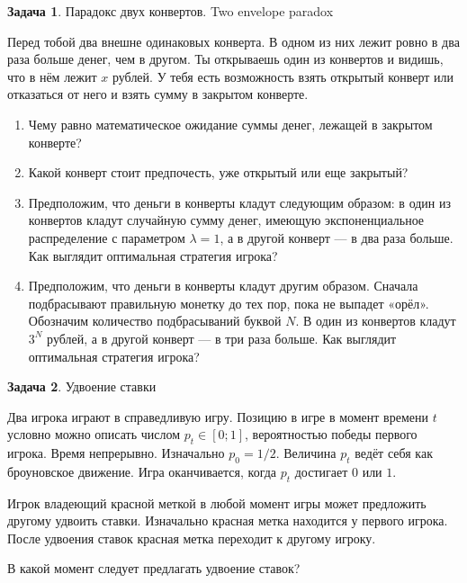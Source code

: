 \documentclass[nobib]{tufte-handout}
\theoremstyle{definition}
\newtheorem{problem}{Задача}
\begin{document}
\begin{problem}
Парадокс двух конвертов. Two envelope paradox

Перед тобой два внешне одинаковых конверта. В одном из них лежит ровно в два раза больше денег, чем в другом. Ты открываешь один из конвертов и видишь, что в нём лежит $x$ рублей. У тебя есть возможность взять открытый конверт или отказаться от него и взять сумму в закрытом конверте.

\begin{enumerate}
\item Чему равно математическое ожидание суммы денег, лежащей в закрытом конверте?
\item Какой конверт стоит предпочесть, уже открытый или еще закрытый?
\item Предположим, что деньги в конверты кладут следующим образом: в один из конвертов кладут случайную сумму денег, имеющую экспоненциальное распределение с параметром $\lambda=1$, а в другой конверт — в два раза больше. Как выглядит оптимальная стратегия игрока?
\item Предположим, что деньги в конверты кладут другим образом. Сначала подбрасывают правильную монетку до тех пор, пока не выпадет «орёл». Обозначим количество подбрасываний буквой $N$. В один из конвертов кладут $3^N$ рублей, а в другой конверт — в три раза больше. Как выглядит оптимальная стратегия игрока?
\end{enumerate}


\end{problem}


\begin{problem}
Удвоение ставки

Два игрока играют в справедливую игру. Позицию в игре в момент времени $t$ условно можно описать числом $p_t \in [0;1]$, вероятностью победы первого игрока. Время непрерывно. Изначально $p_0=1/2$. Величина $p_t$ ведёт себя как броуновское движение. Игра оканчивается, когда $p_t$ достигает $0$ или $1$.

Игрок владеющий красной меткой в любой момент игры может предложить другому удвоить ставки. Изначально красная метка находится у первого игрока. После удвоения ставок красная метка переходит к другому игроку.

В какой момент следует предлагать удвоение ставок?

\end{problem}
\end{document}
